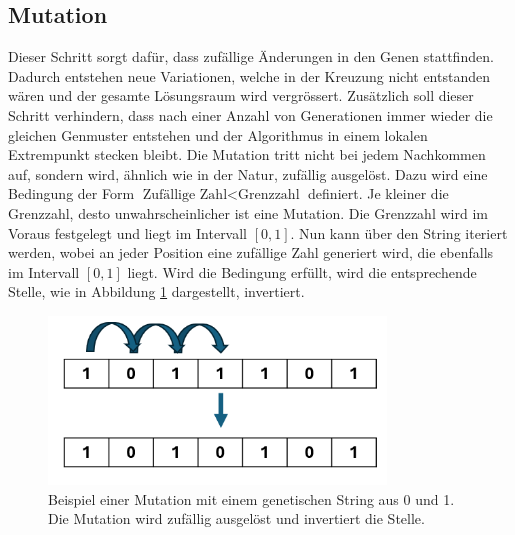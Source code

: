 %
%
%
%
\subsection{Mutation
\label{buch:paper:varalg:subsection:mutation}}
%
Dieser Schritt sorgt dafür, dass zufällige Änderungen in den Genen 
stattfinden. Dadurch entstehen neue Variationen, welche in der 
Kreuzung nicht entstanden wären und der gesamte Lösungsraum wird 
vergrössert. Zusätzlich soll dieser Schritt verhindern, dass nach 
einer Anzahl von Generationen immer wieder die gleichen 
Genmuster entstehen und der Algorithmus in einem lokalen Extrempunkt 
stecken bleibt.
Die Mutation tritt nicht bei jedem Nachkommen auf, sondern wird, 
ähnlich wie in der Natur, zufällig ausgelöst. Dazu wird eine Bedingung 
der Form \( \text{Zufällige Zahl} < \text{Grenzzahl} \) definiert. 
Je kleiner die Grenzzahl, desto unwahrscheinlicher ist eine Mutation. 
Die Grenzzahl wird im Voraus festgelegt und liegt im Intervall \([0,1]\).
Nun kann über den String iteriert werden, wobei an jeder Position eine 
zufällige Zahl generiert wird, die ebenfalls im Intervall \([0,1]\) 
liegt. Wird die Bedingung erfüllt, wird die entsprechende Stelle, 
wie in Abbildung \ref{fig:mutation_genetic_string} dargestellt,
invertiert.
\begin{figure}
	\centering
	\includegraphics[width=0.8\textwidth]{
        papers/varalg/images/teil3/09GeneticStringMutation.png
        }
	\caption{
	Beispiel einer Mutation mit einem genetischen String aus 0 und 1. Die
	Mutation wird zufällig ausgelöst und invertiert die Stelle.
	}
	\label{fig:mutation_genetic_string}
\end{figure}

